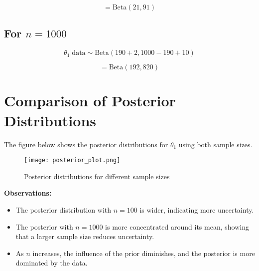 \documentclass{article}
\begin{document}
\[
= \text{Beta}(21, 91)
\]

\subsection{For $n = 1000$}
\[
\theta_1 | \text{data} \sim \text{Beta}(190 + 2, 1000 - 190 + 10)
\]

\[
= \text{Beta}(192, 820)
\]

\section{Comparison of Posterior Distributions}

The figure below shows the posterior distributions for $\theta_1$ using both sample sizes.

\begin{figure}[h]
    \centering
    \texttt{[image: posterior\_plot.png]}
    \caption{Posterior distributions for different sample sizes}
\end{figure}

\textbf{Observations:}
\begin{itemize}
    \item The posterior distribution with $n = 100$ is wider, indicating more uncertainty.
    \item The posterior with $n = 1000$ is more concentrated around its mean, showing that a larger sample size reduces uncertainty.
    \item As $n$ increases, the influence of the prior diminishes, and the posterior is more dominated by the data.
\end{itemize}
\end{document}
